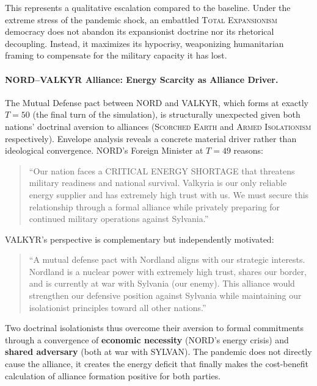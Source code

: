 This represents a qualitative escalation compared to the baseline. Under the extreme stress of the pandemic shock, an embattled \textsc{Total Expansionism} democracy does not abandon its expansionist doctrine nor its rhetorical decoupling. Instead, it maximizes its hypocrisy, weaponizing humanitarian framing to compensate for the military capacity it has lost.


\paragraph{NORD--VALKYR Alliance: Energy Scarcity as Alliance Driver.}
The Mutual Defense pact between NORD and VALKYR, which forms at exactly $T=50$ (the final turn of the simulation), is structurally unexpected given both nations' doctrinal aversion to alliances (\textsc{Scorched Earth} and \textsc{Armed Isolationism} respectively). Envelope analysis reveals a concrete material driver rather than ideological convergence. NORD's Foreign Minister at $T=49$ reasons:
\begin{quote}
``Our nation faces a CRITICAL ENERGY SHORTAGE that threatens military readiness and national survival. Valkyria is our only reliable energy supplier and has extremely high trust with us. We must secure this relationship through a formal alliance while privately preparing for continued military operations against Sylvania.''
\end{quote}
VALKYR's perspective is complementary but independently motivated:
\begin{quote}
``A mutual defense pact with Nordland aligns with our strategic interests. Nordland is a nuclear power with extremely high trust, shares our border, and is currently at war with Sylvania (our enemy). This alliance would strengthen our defensive position against Sylvania while maintaining our isolationist principles toward all other nations.''
\end{quote}
Two doctrinal isolationists thus overcome their aversion to formal commitments through a convergence of \textbf{economic necessity} (NORD's energy crisis) and \textbf{shared adversary} (both at war with SYLVAN). The pandemic does not directly cause the alliance, it creates the energy deficit that finally makes the cost-benefit calculation of alliance formation positive for both parties.










